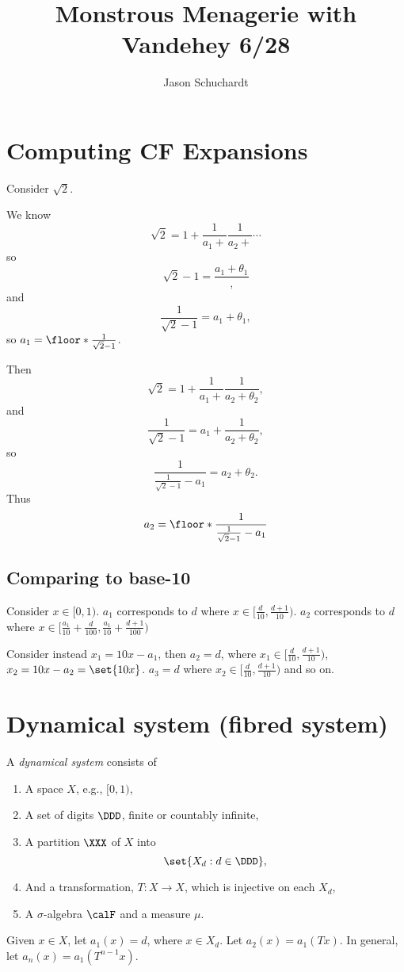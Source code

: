 \documentclass{article}
\title{Monstrous Menagerie with Vandehey 6/28}
\author{Jason Schuchardt}
\newcommand\cft[1]{\frac{1}{#1+}}
\begin{document}
\section{Computing CF Expansions}

Consider $\sqrt{2}$.

We know
\[\sqrt{2} = 1 + \cft{a_1} \cft{a_2}\cdots \]
so
\[ \sqrt{2}-1 = \frac{a_1+\theta_1},\]
and
\[ \frac{1}{\sqrt{2}-1} = a_1+\theta_1, \]
so $a_1 = \floor*{\frac{1}{\sqrt{2}-1}}$.

Then \[\sqrt{2} = 1 + \cft{a_1}\frac{1}{a_2+\theta_2},\]
and
\[ \frac{1}{\sqrt{2}-1} = a_1 + \frac{1}{a_2+\theta_2}, \]
so 
\[\frac{1}{\frac{1}{\sqrt{2}-1}-a_1} = a_2 + \theta_2.\]
Thus
\[ a_2 = \floor*{\frac{1}{\frac{1}{\sqrt{2}-1}-a_1}}\]

\subsection{Comparing to base-10}

Consider $x\in[0,1)$.
$a_1$ corresponds to $d$ where $x\in [\frac{d}{10},\frac{d+1}{10})$.
$a_2$ corresponds to $d$ where
$x\in [\frac{a_1}{10}+\frac{d}{100}, \frac{a_1}{10}+\frac{d+1}{100})$

Consider instead $x_1=10x-a_1$, then $a_2=d$, where
$x_1\in [\frac{d}{10},\frac{d+1}{10})$,
$x_2 = 10x-a_2 = \set{10x}$.
$a_3=d$ where $x_2 \in [\frac{d}{10},\frac{d+1}{10})$ and so on.

\section{Dynamical system (fibred system)}

\begin{definition}
A \emph{dynamical system} consists of 
\begin{enumerate}[1)]
    \item A space $X$, e.g., $[0,1)$,
    \item A set of digits $\DDD$, finite or countably infinite,
    \item A partition $\XXX$ of $X$ into 
        \[ \set{X_d : d\in \DDD},\]
    \item And a transformation, $T:X\to X$, which is injective
        on each $X_d$,
    \item A $\sigma$-algebra $\calF$ and a measure $\mu$.
\end{enumerate}
\end{definition}

Given $x\in X$, let $a_1(x) = d$, where $x\in X_d$.
Let $a_2(x)=a_1(Tx)$. In general, let
$a_{n}(x) = a_1(T^{n-1}x)$.
\end{document}
